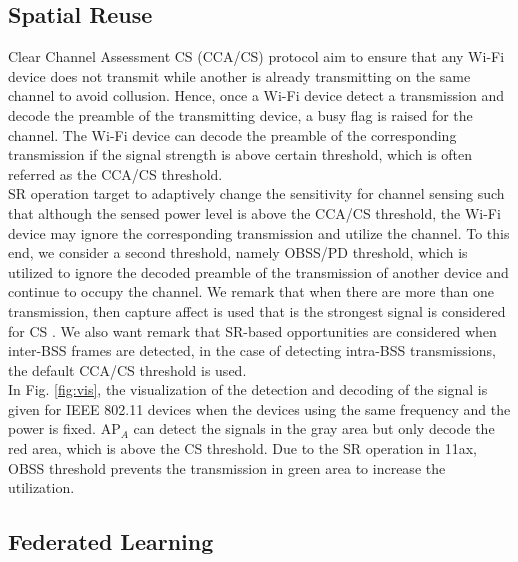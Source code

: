 \documentclass[journal]{IEEEtran}
\begin{document}
\subsection{Spatial Reuse}
Clear Channel Assessment CS (CCA/CS) protocol aim to ensure that any Wi-Fi device does not transmit while another is already transmitting on the same channel to avoid collusion. Hence, once a Wi-Fi device detect a transmission and decode the preamble of the transmitting device, a busy flag is raised for the channel. The Wi-Fi device can decode the preamble of the corresponding transmission if the signal strength is above certain threshold, which is often referred as the CCA/CS threshold.\\
\indent  SR operation target to adaptively change the sensitivity for channel sensing such that although the sensed power level is above the CCA/CS threshold, the Wi-Fi device may ignore the corresponding transmission and utilize the channel. To this end, we consider a second threshold, namely OBSS/PD threshold, which is utilized to ignore the decoded preamble of the transmission of another device and continue to occupy the channel. We remark that when there are more than one transmission, then capture affect is used that is the strongest signal is considered for CS \cite{wilhelmi2021spatial}. We also want remark that SR-based opportunities are considered when inter-BSS frames are detected, in the case of detecting intra-BSS transmissions, the default
CCA/CS threshold is used.\\
\indent In Fig. \ref{fig:vis}, the visualization of the detection and decoding of the signal is given for IEEE 802.11 devices \cite{wilhelmi2021spatial} when the devices using the same frequency and the power is fixed. AP$_A$ can detect the signals in the gray area but only decode the red area, which is above the CS threshold. Due to the SR operation in 11ax, OBSS threshold prevents the transmission in green area to increase the utilization. 



\subsection{Federated Learning}
\end{document}
